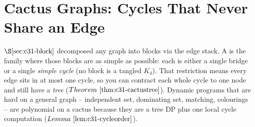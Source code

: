 \section{Cactus Graphs: Cycles That Never Share an Edge}\label{sec:c31-cactus}

\begin{previouslybox}
\(\secref{c31-block}\) decomposed any graph into blocks via the edge stack.  A
 is the family where those blocks are as simple as possible: each is
either a single bridge or a single \emph{simple cycle} (no block is a tangled
\(K_4\)).  That restriction means every edge sits in at most one cycle, so you can
contract each whole cycle to one node and still have a \emph{tree}
(\(\thmref{c31-cactustree}\)).  Dynamic programs that are hard on a general graph --
independent set, dominating set, matching, colourings -- are polynomial on a cactus
because they are a tree DP plus one local cycle computation
(\(\lemref{c31-cycleorder}\)).
\end{previouslybox}

